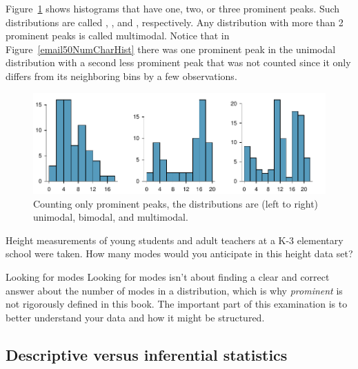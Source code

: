 Figure~\ref{singleBiMultiModalPlots} shows histograms that have one, two, or three prominent peaks. Such distributions are called , , and , respectively. Any distribution with more than 2 prominent peaks is called multimodal. Notice that in Figure~\ref{email50NumCharHist} there was one prominent peak in the unimodal distribution with a second less prominent peak that was not counted since it only differs from its neighboring bins by a few observations.

\begin{figure}[h]
   \centering
   \includegraphics[width=\textwidth]{ch_summarizing_data/figures/singleBiMultiModalPlots/singleBiMultiModalPlots}
   \caption{Counting only prominent peaks, the distributions are (left to right) unimodal, bimodal, and multimodal.}
   \label{singleBiMultiModalPlots}
\end{figure}

\begin{exercisewrap}
\begin{nexercise}
Height measurements of young students and adult teachers at a K-3 elementary school were taken. How many modes would you anticipate in this height data set?\footnotemark
\end{nexercise}
\end{exercisewrap}

\begin{onebox}{Looking for modes}
Looking for modes isn't about finding a clear and correct answer about the number of modes in a distribution, which is why \emph{prominent} is not rigorously defined in this book. The important part of this examination is to better understand your data and how it might be structured.\end{onebox}

\subsection{Descriptive versus inferential statistics}

